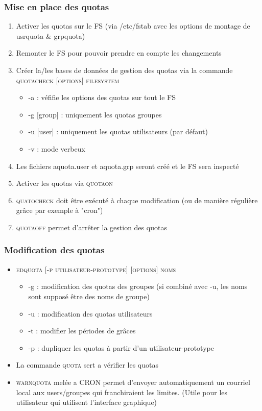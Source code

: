 \documentclass[a4paper]{article}
\begin{document}
      \subsubsection{Mise en place des quotas}
      \begin{enumerate}
        \item Activer les quotas sur le FS (via /etc/fstab avec les options de montage de usrquota \& grpquota)
        \item Remonter le FS pour pouvoir prendre en compte les changements
        \item Créer la/les bases de données de gestion des quotas via la commande \textsc{quotacheck [options] filesystem}
        \begin{itemize}[label=, font=\scriptsize] 
          \item -a : véfifie les options des quotas sur tout le FS
          \item -g [group] : uniquement les quotas groupes
          \item -u [user] : uniquement les quotas utilisateurs (par défaut)
          \item -v : mode verbeux
        \end{itemize}
        \item Les fichiers aquota.user et aquota.grp seront créé et le FS sera inspecté
        \item Activer les quotas via \textsc{quotaon}
        \item \textsc{quatocheck} doit être exécuté à chaque modification (ou de manière régulière grâce par exemple à "cron")
        \item \textsc{quotaoff} permet d'arrêter la gestion des quotas
      \end{enumerate}

      \subsubsection{Modification des quotas}
      \begin{itemize}[label=\textbullet, font=\Large]
        \item \textsc{edquota [-p utilisateur-prototype] [options] noms}
        \begin{itemize}[label=, font=\scriptsize] 
          \item -g : modification des quotas des groupes (si combiné avec -u, les noms sont supposé être des noms de groupe)
          \item -u : modification des quotas utilisateurs
          \item -t : modifier les périodes de grâces
          \item -p : dupliquer les quotas à partir d'un utilisateur-prototype
        \end{itemize}
        \item La commande \textsc{quota} sert a vérifier les quotas
        \item \textsc{warnquota} melée a CRON permet d'envoyer automatiquement un courriel local aux users/groupes qui franchiraient les limites. (Utile pour les utilisateur qui utilisent l'interface graphique)
      \end{itemize}
\end{document}

